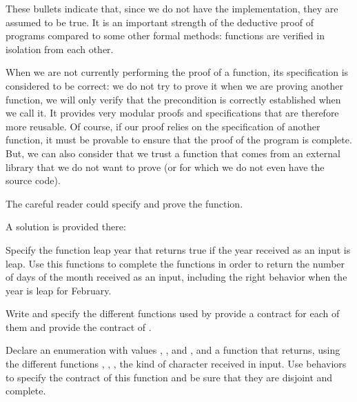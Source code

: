 

These bullets indicate that, since we do not have the implementation,
they are assumed to be true. It is an important strength of the
deductive proof of programs compared to some other formal methods:
functions are verified in isolation from each other.

When we are not currently performing the proof of a function, its
specification is considered to be correct: we do not try to prove it
when we are proving another function, we will only verify that the
precondition is correctly established when we call it. It provides very
modular proofs and specifications that are therefore more reusable. Of
course, if our proof relies on the specification of another function, it
must be provable to ensure that the proof of the program is complete.
But, we can also consider that we trust a function that comes from an
external library that we do not want to prove (or for which we do not
even have the source code).

The careful reader could specify and prove the 
function.

A solution is provided there:








\label{l4:contract-modularity-ex-days-of-month}


Specify the function leap year that returns true if the year received
as an input is leap. Use this functions to complete the functions
 in order to return the number of days of the
month received as an input, including the right behavior when the year
is leap for February.





\label{l4:contract-modularity-ex-alpha-num}


Write and specify the different functions used by
 provide a contract for each of them and
provide the contract of .





Declare an enumeration with values , ,
 and , and a function
 that returns, using the different
functions , ,
, the kind of character received in input. Use
behaviors to specify the contract of this function and be sure that
they are disjoint and complete.




